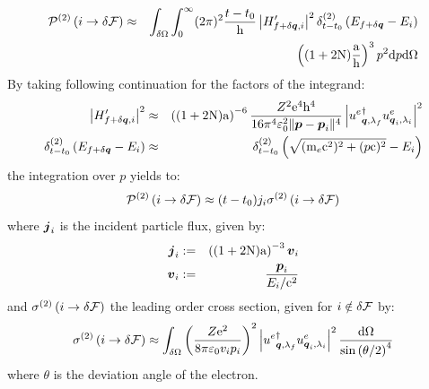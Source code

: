 \documentclass[10pt,a4paper,twoside,openany]{book}
\begin{document}
\begin{eqnarray*}
\TPn i {\delta \F} 2 & \approx & \int_{\delta \Omega} \int_0^{\infty} ( 2 \pi )^2 \frac{t - t_0} \h \left| H'_{f + \delta \q,i} \right|^2 \deltaE2{E_{f + \delta \q} - E_i} \\
&& \left( (1 + 2 \N) \frac \a \h \right)^3 p^2 \dnp \dO
\end{eqnarray*}
By taking following continuation for the factors of the integrand:
\begin{eqnarray*}
\left| H'_{f + \delta \q,i} \right|^2 & \approx & \left( (1+2\N) \a \right)^{-6} \frac {Z^2 \e^4 \h^4}{16 \pi^4 \vpty^2 \norm{\p - \p_i}^4} \left| \ddirspin \electron \q {\sp_f} \dirspin \electron {\q_i} {\sp_i} \right|^2 \\
\deltaE2{E_{f + \delta \q} - E_i} & \approx & \deltaE2{\sqrt{(\mp \electron \c^2)^2 + (p \c)^2} - E_i}
\end{eqnarray*}
the integration over $p$ yields to:
\begin{equation*}
\TPn i {\delta \F} 2 \approx (t - t_0) j_i \CSn i {\delta \F} 2
\end{equation*}
where $\sv j_i$ is the incident particle flux, given by:
\begin{eqnarray*}
\sv j_i & \eqdef & \left( (1+2\N) \a \right)^{-3} \sv v_i \\
\sv v_i & \eqdef & \frac {\p_i} {E_i / \c^2}
\end{eqnarray*}
and $\CSn i {\delta \F} 2$ the leading order cross section, given for $i \notin \delta \F$ by:
\begin{equation*}
\CSn i {\delta \F} 2 \approx \int_{\delta \Omega} \left( \frac {Z \e^2} {8 \pi \vpty v_i p_i} \right)^2 \left| \ddirspin \electron \q {\sp_f} \dirspin \electron {\q_i} {\sp_i} \right|^2 \frac {\dO} {\sin{\theta / 2}^4}
\end{equation*}
where $\theta$ is the deviation angle of the electron.
\end{document}
